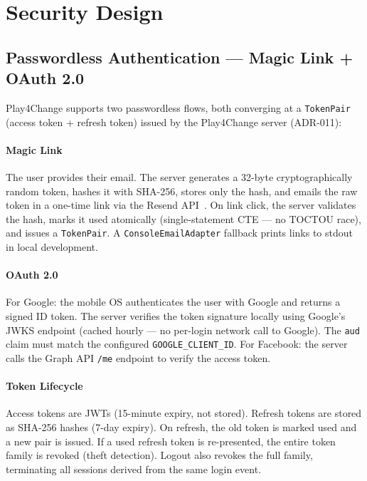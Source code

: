 \section{Security Design}
\label{sec:security}

\subsection{Passwordless Authentication — Magic Link + OAuth 2.0}
\label{ssec:auth_impl}

Play4Change supports two passwordless flows, both converging at a \texttt{TokenPair} (access token + refresh token) issued by the Play4Change server (ADR-011):

\paragraph{Magic Link} The user provides their email. The server generates a 32-byte cryptographically random token, hashes it with SHA-256, stores only the hash, and emails the raw token in a one-time link via the Resend API~\cite{resend2024}. On link click, the server validates the hash, marks it used atomically (single-statement CTE — no TOCTOU race), and issues a \texttt{TokenPair}. A \texttt{ConsoleEmailAdapter} fallback prints links to stdout in local development.

\paragraph{OAuth 2.0} For Google: the mobile OS authenticates the user with Google and returns a signed ID token. The server verifies the token signature locally using Google's JWKS endpoint (cached hourly — no per-login network call to Google). The \texttt{aud} claim must match the configured \texttt{GOOGLE\_CLIENT\_ID}. For Facebook: the server calls the Graph API \texttt{/me} endpoint to verify the access token.

\paragraph{Token Lifecycle} Access tokens are JWTs (15-minute expiry, not stored). Refresh tokens are stored as SHA-256 hashes (7-day expiry). On refresh, the old token is marked used and a new pair is issued. If a used refresh token is re-presented, the entire token family is revoked (theft detection). Logout also revokes the full family, terminating all sessions derived from the same login event.

